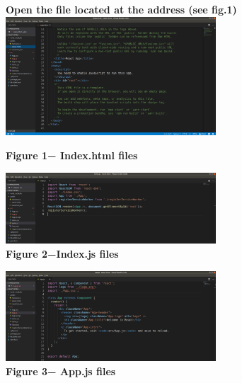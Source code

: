 \begin{figure}[H]
	{\bfseries Open the file located at the address (see fig.1)}
	\centering
	\includegraphics[width=0.7\textwidth]{assets/126}
	\caption*{\bfseries Figure 1− Index.html files}
\end{figure}




\begin{figure}[H]
	\centering
	\includegraphics[width=0.7\textwidth]{assets/127}
	\caption*{\bfseries Figure 2−Index.js files}
\end{figure}


\begin{figure}[H]
	\centering
	\includegraphics[width=0.7\textwidth]{assets/128}
	\caption*{\bfseries Figure 3− App.js files}
\end{figure}




